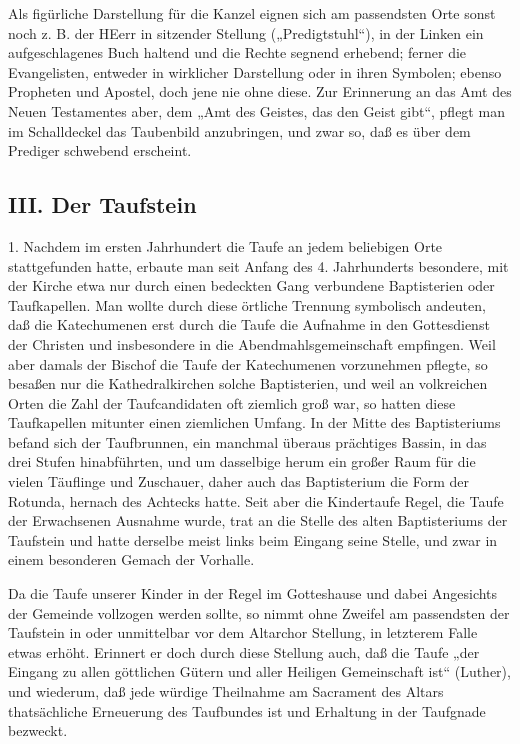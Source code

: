 Als figürliche Darstellung für die Kanzel eignen sich am passendsten Orte sonst noch z. B. der HEerr in sitzender Stellung („Predigtstuhl“), in der Linken ein aufgeschlagenes Buch haltend und die Rechte segnend erhebend; ferner die Evangelisten, entweder in wirklicher Darstellung oder in ihren Symbolen; ebenso Propheten und Apostel, doch jene nie ohne diese. Zur Erinnerung an das Amt des Neuen Testamentes aber, dem „Amt des Geistes, das den Geist gibt“, pflegt man im Schalldeckel das Taubenbild anzubringen, und zwar so, daß es über dem Prediger schwebend erscheint.

\subsection{III. Der Taufstein}


1. Nachdem im ersten Jahrhundert die Taufe an jedem beliebigen Orte stattgefunden hatte, erbaute man seit Anfang des 4. Jahrhunderts besondere, mit der Kirche etwa nur durch einen bedeckten Gang verbundene Baptisterien oder Taufkapellen. Man wollte durch diese örtliche Trennung symbolisch
andeuten, daß die Katechumenen erst durch die Taufe die Aufnahme in den Gottesdienst der Christen und insbesondere in die Abendmahlsgemeinschaft empfingen. Weil aber damals der Bischof die Taufe der Katechumenen vorzunehmen pflegte, so besaßen nur die Kathedralkirchen solche Baptisterien, und weil an volkreichen Orten die Zahl der Taufcandidaten oft ziemlich groß war, so hatten diese Taufkapellen mitunter einen ziemlichen Umfang. In der Mitte des Baptisteriums befand sich der Taufbrunnen, ein manchmal überaus prächtiges Bassin, in das drei Stufen hinabführten, und um dasselbige herum ein großer Raum für die vielen Täuflinge und Zuschauer, daher auch das Baptisterium die Form der Rotunda, hernach des Achtecks hatte. Seit aber die Kindertaufe Regel, die Taufe der Erwachsenen Ausnahme wurde, trat an die Stelle des alten Baptisteriums der Taufstein und hatte derselbe meist links beim Eingang seine Stelle, und zwar in einem besonderen Gemach der Vorhalle.

Da die Taufe unserer Kinder in der Regel im Gotteshause und dabei Angesichts der Gemeinde vollzogen werden sollte, so nimmt ohne Zweifel am passendsten der Taufstein in oder unmittelbar vor dem Altarchor Stellung, in letzterem Falle etwas erhöht. Erinnert er doch durch diese Stellung auch, daß die Taufe „der Eingang zu allen göttlichen Gütern und aller Heiligen Gemeinschaft ist“ (Luther), und wiederum, daß jede würdige Theilnahme am Sacrament des Altars thatsächliche Erneuerung des Taufbundes ist und Erhaltung in der Taufgnade bezweckt.

